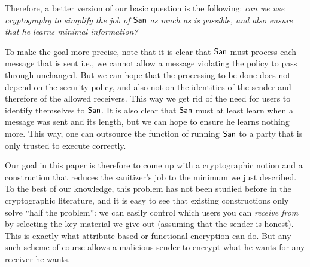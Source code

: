 \documentclass{llncs}
\begin{document}
Therefore, a better version of our basic question is the following: \emph{can we use cryptography to simplify
the job of $\mathsf{San}$ as much as is possible, and also ensure that he learns minimal information?} 

To make the goal more precise, note that it is clear that $\mathsf{San}$ must process each message that is sent
i.e., we cannot allow a message violating the policy to pass through unchanged. But we can hope that the processing to be done does not depend on the security policy, and also not on the identities of the sender and therefore of the allowed receivers. This way we get rid of the need for users to identify themselves to $\mathsf{San}$. It is also clear that $\mathsf{San}$ must at least learn when a message was sent and its length, but we can hope to ensure he learns nothing more. This way, one can outsource the function of running $\mathsf{San}$ to a party that is only trusted to execute correctly.

Our goal in this paper is therefore to come up with a cryptographic notion and a construction that  reduces the sanitizer's job to the minimum we just described.
To the best of our knowledge, this problem has not been studied before in the cryptographic literature, and it is easy to see that existing constructions only solve ``half the problem'': we can easily control which users you can \emph{receive from} by selecting the key material we give out (assuming that the sender is honest). This is exactly what attribute based \cite{DBLP:conf/ccs/GoyalPSW06} or functional encryption \cite{DBLP:conf/tcc/BonehSW11} can do. But any such scheme of course allows a malicious sender to encrypt what he wants for any receiver he wants.
\end{document}
